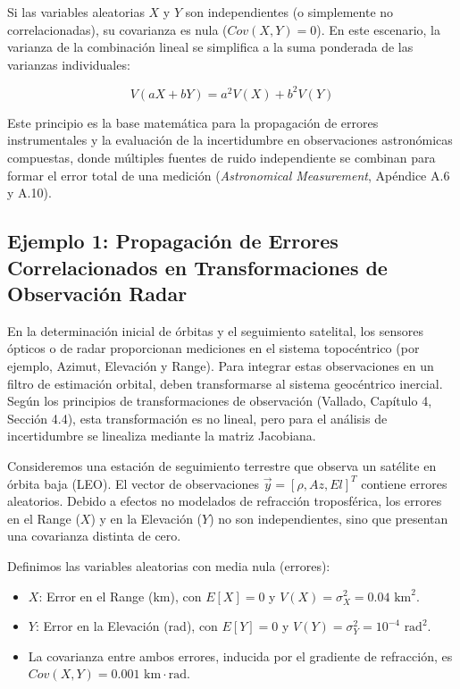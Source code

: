 Si las variables aleatorias $X$ y $Y$ son independientes (o simplemente no correlacionadas), su covarianza es nula ($Cov(X,Y) = 0$). En este escenario, la varianza de la combinación lineal se simplifica a la suma ponderada de las varianzas individuales:

$$ V(aX + bY) = a^2V(X) + b^2V(Y) $$

Este principio es la base matemática para la propagación de errores instrumentales y la evaluación de la incertidumbre en observaciones astronómicas compuestas, donde múltiples fuentes de ruido independiente se combinan para formar el error total de una medición (\textit{Astronomical Measurement}, Apéndice A.6 y A.10).


\subsection{Ejemplo 1: Propagación de Errores Correlacionados en Transformaciones de Observación Radar}

En la determinación inicial de órbitas y el seguimiento satelital, los sensores ópticos o de radar proporcionan mediciones en el sistema topocéntrico (por ejemplo, Azimut, Elevación y Range). Para integrar estas observaciones en un filtro de estimación orbital, deben transformarse al sistema geocéntrico inercial. Según los principios de transformaciones de observación (Vallado, Capítulo 4, Sección 4.4), esta transformación es no lineal, pero para el análisis de incertidumbre se linealiza mediante la matriz Jacobiana. 

Consideremos una estación de seguimiento terrestre que observa un satélite en órbita baja (LEO). El vector de observaciones $\vec{y} = [\rho, Az, El]^T$ contiene errores aleatorios. Debido a efectos no modelados de refracción troposférica, los errores en el Range ($X$) y en la Elevación ($Y$) no son independientes, sino que presentan una covarianza distinta de cero. 

Definimos las variables aleatorias con media nula (errores):
\begin{itemize}
    \item $X$: Error en el Range (km), con $E[X] = 0$ y $V(X) = \sigma_X^2 = 0.04 \text{ km}^2$.
    \item $Y$: Error en la Elevación (rad), con $E[Y] = 0$ y $V(Y) = \sigma_Y^2 = 10^{-4} \text{ rad}^2$.
    \item La covarianza entre ambos errores, inducida por el gradiente de refracción, es $Cov(X,Y) = 0.001 \text{ km}\cdot\text{rad}$.
\end{itemize}

